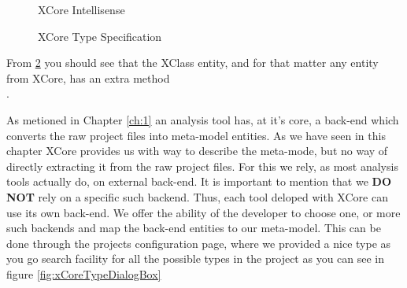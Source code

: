         \begin{figure}
        \centering
        \caption{XCore Intellisense \cite{oldThesis}}
        \label{fig:xCoreCommentView} 
        \end{figure}

        \begin{figure}[ht]
        \centering
        \caption{XCore Type Specification \cite{oldThesis}}
        \label{fig:xCorexRunExample}
        \end{figure}

        From \ref{fig:xCorexRunExample} you should see that the XClass entity, and for that matter any entity from XCore, has an extra method \\ .

        As metioned in Chapter \ref{ch:1} an analysis tool has, at it's core, a back-end which converts the raw project files into meta-model entities. As we have seen in this chapter XCore
provides us with way to describe the meta-mode, but no way of directly extracting it from the raw project files. For this we rely, as most analysis tools actually do, on external 
back-end. It is important to mention that we \textbf{DO NOT} rely on a specific such backend. Thus, each tool deloped with XCore can use its own back-end.
We offer the ability of the developer to choose one, or more such backends and map the back-end entities to our meta-model.
This can be done through the projects configuration page, where we provided a nice type as you go search facility for all the possible types in the project as you can see in figure \ref{fig:xCoreTypeDialogBox}

